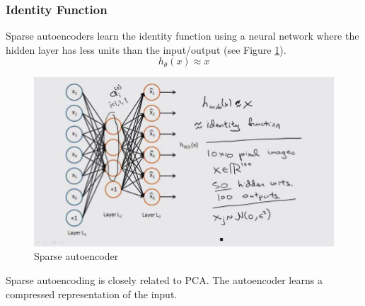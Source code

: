\documentclass[a4paper,twoside,10pt]{article}
\begin{document}
\subsubsection{Identity Function}
Sparse autoencoders\citep{andrewngsparse1,andrewngsparse2} learn the identity function using a neural network where the hidden layer has less units than the input/output (see Figure \ref{fig:sparse}).
\begin{equation*}
    h_\theta(x)\approx x
\end{equation*}
\begin{figure}[htbp]
  \begin{center}
    \includegraphics[width=.6\textwidth]{sparse}
    \caption{Sparse autoencoder\citep{andrewngsparse2}\label{fig:sparse}}
  \end{center}
\end{figure}
Sparse autoencoding is closely related to \ac{PCA}.
The autoencoder learns a compressed representation of the input.
\end{document}
